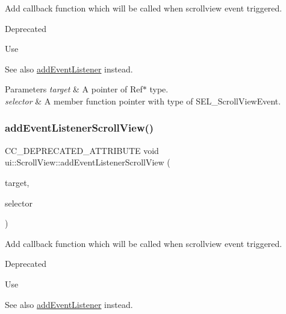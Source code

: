 Add callback function which will be called when scrollview event triggered. \begin{DoxyRefDesc}{Deprecated}
\item[\hyperlink{deprecated__deprecated000160}{Deprecated}]Use\end{DoxyRefDesc}
\begin{DoxySeeAlso}{See also}
{\ttfamily \hyperlink{classui_1_1ScrollView_ad8aeb3841d9330558f538d4aad679073}{add\+Event\+Listener}} instead. 
\end{DoxySeeAlso}

\begin{DoxyParams}{Parameters}
{\em target} & A pointer of {\ttfamily Ref$\ast$} type. \\
\hline
{\em selector} & A member function pointer with type of {\ttfamily S\+E\+L\+\_\+\+Scroll\+View\+Event}. \\
\hline
\end{DoxyParams}
\mbox{\label{classui_1_1ScrollView_a5f0d2da546a598cd657199b11d69a5f6}} 
\subsubsection{\texorpdfstring{add\+Event\+Listener\+Scroll\+View()}{addEventListenerScrollView()}\hspace{0.1cm}{\footnotesize\ttfamily [2/2]}}
{\footnotesize\ttfamily C\+C\+\_\+\+D\+E\+P\+R\+E\+C\+A\+T\+E\+D\+\_\+\+A\+T\+T\+R\+I\+B\+U\+TE void ui\+::\+Scroll\+View\+::add\+Event\+Listener\+Scroll\+View (\begin{DoxyParamCaption}\item[{\hyperlink{classRef}{Ref} $\ast$}]{target,  }\item[{S\+E\+L\+\_\+\+Scroll\+View\+Event}]{selector }\end{DoxyParamCaption})}

Add callback function which will be called when scrollview event triggered. \begin{DoxyRefDesc}{Deprecated}
\item[\hyperlink{deprecated__deprecated000395}{Deprecated}]Use\end{DoxyRefDesc}
\begin{DoxySeeAlso}{See also}
{\ttfamily \hyperlink{classui_1_1ScrollView_ad8aeb3841d9330558f538d4aad679073}{add\+Event\+Listener}} instead. 
\end{DoxySeeAlso}

